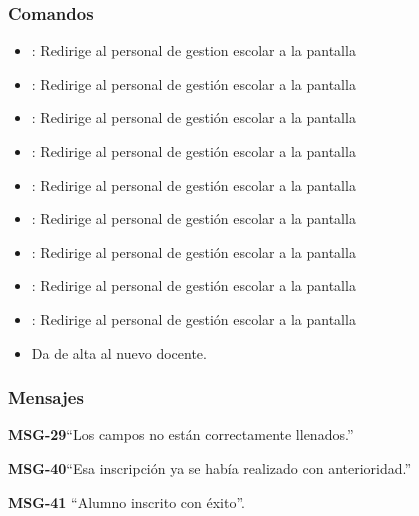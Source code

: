 \subsubsection{Comandos}
\begin{itemize}
	\item {}: Redirige al personal de gestion escolar a la pantalla 
	
	\item {}: Redirige al personal de gestión escolar a la pantalla 
	\item {}: Redirige al personal de gestión escolar a la pantalla 
	
	\item {}: Redirige al personal de gestión escolar a la pantalla 
	\item {}: Redirige al personal de gestión escolar a la pantalla 
	
	\item {}: Redirige al personal de gestión escolar a la pantalla 
	\item {}: Redirige al personal de gestión escolar a la pantalla 
	
	\item {}: Redirige al personal de gestión escolar a la pantalla 
	\item {}: Redirige al personal de gestión escolar a la pantalla 
	
	\item {} Da de alta al nuevo docente.
\end{itemize}

\subsubsection{Mensajes}
\begin{Citemize}
	\item {\bf MSG-29}{``Los campos no están correctamente llenados.''}
	\item {\bf MSG-40}{``Esa inscripción ya se había realizado con anterioridad.''}
	\item {\bf MSG-41} ``Alumno inscrito con éxito''.
\end{Citemize}
